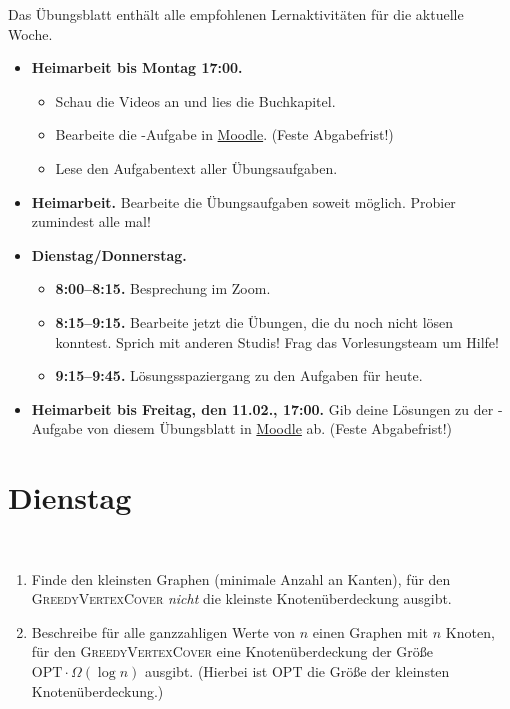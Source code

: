 \documentclass{uebung_cs}
\begin{document}
Das Übungsblatt enthält alle empfohlenen Lernaktivitäten für die aktuelle Woche.

\begin{itemize}
\item \textbf{Heimarbeit bis Montag 17:00.}
    \begin{itemize}
    \item 
    Schau die Videos an und lies die Buchkapitel.
    \item Bearbeite die -Aufgabe in \href{https://moodle.studiumdigitale.uni-frankfurt.de/moodle/course/view.php?id=2241}{Moodle}. (Feste Abgabefrist!)
    \item Lese den Aufgabentext aller Übungsaufgaben.
    \end{itemize}
\item \textbf{Heimarbeit.} Bearbeite die Übungsaufgaben soweit möglich. Probier zumindest alle mal!
\item \textbf{Dienstag/Donnerstag.}
\begin{itemize}
    \item \textbf{8:00--8:15.} Besprechung im Zoom.
    \item \textbf{8:15--9:15.} Bearbeite jetzt die Übungen, die du noch nicht lösen konntest. Sprich mit anderen Studis! Frag das Vorlesungsteam um Hilfe!
    \item \textbf{9:15--9:45.} Lösungsspaziergang zu den Aufgaben für heute.
\end{itemize}

\item \textbf{Heimarbeit bis Freitag, den 11.02., 17:00.} Gib deine Lösungen zu der -Aufgabe von diesem Übungsblatt in \href{https://moodle.studiumdigitale.uni-frankfurt.de/moodle/course/view.php?id=2241}{Moodle} ab. (Feste Abgabefrist!)
\end{itemize}

\section*{Dienstag}

\begin{aufgabe}\
	\begin{enumerate}
		\item Finde den kleinsten Graphen (minimale Anzahl an Kanten), für den \textsc{GreedyVertexCover} \emph{nicht} die kleinste Knotenüberdeckung ausgibt.
		\item Beschreibe für alle ganzzahligen Werte von $n$ einen Graphen mit $n$ Knoten, für den \textsc{GreedyVertexCover} eine Knotenüberdeckung der Größe $\mathrm{OPT} \cdot \Omega(\log n)$ ausgibt.
		(Hierbei ist $\mathrm{OPT}$ die Größe der kleinsten Knotenüberdeckung.)
	\end{enumerate}
	
\end{aufgabe}
\end{document}
